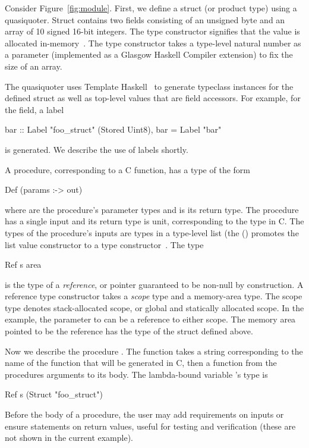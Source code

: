 Consider Figure~\ref{fig:module}.  First, we define a struct (or product type)
using a quasiquoter.  Struct  contains two fields
consisting of an unsigned byte and an array of 10 signed 16-bit integers.  The
 type constructor signifies that the value is allocated
in-memory~\cite{memareas}.  The  type constructor takes a type-level
natural number as a parameter (implemented as a Glasgow Haskell Compiler
extension) to fix the size of an array.

The quasiquoter uses Template Haskell~\cite{th} to generate
typeclass instances for the defined struct as well as top-level values that are
field accessors.  For example, for the  field, a label
\begin{code}
bar :: Label "foo\_struct" (Stored Uint8),
bar = Label "bar"
\end{code}
\noindent
is generated.  We describe the use of labels shortly.

A procedure, corresponding to a C function, has a type of the form
\begin{code}
Def (params :-> out)
\end{code}
\noindent
where  are the procedure's parameter types and  is its return
type.  The procedure  has a single input and its return type is
unit, corresponding to the  type in C.  The types of the procedure's
inputs are types in a type-level list (the () promotes the list value
constructor to a type constructor~\cite{datakinds}.  The type
\begin{code}
Ref s area
\end{code}
\noindent
is the type of a \emph{reference}, or pointer guaranteed to be non-null by
construction.  A reference type constructor takes a \emph{scope} type and a
memory-area type.  The scope type denotes stack-allocated scope, or global and
statically allocated scope.  In the example, the parameter to  can
be a reference to either scope.  The memory area pointed to be the reference
has the type of the struct defined above.

Now we describe the procedure .  The function  takes a
string corresponding to the name of the function that will be generated in C,
then a function from the procedures arguments to its body.  The lambda-bound
variable 's type is
\begin{code}
Ref s (Struct "foo\_struct")
\end{code}
\noindent
Before the body of a procedure, the user may add requirements on inputs or
ensure statements on return values, useful for testing and verification (these
are not shown in the current example).

